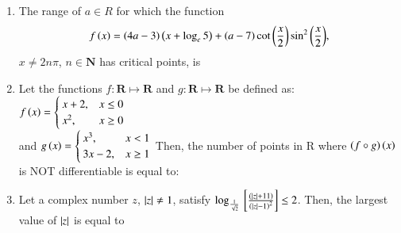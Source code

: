 \documentclass[journal]{IEEEtran}
\numberwithin{equation}{enumi}
\numberwithin{figure}{enumi}
\begin{document}
\begin{enumerate}
    \item 
    The range of $a \in R$ for which the function 
    \begin{align*}
        f\left(x\right) = \left(4a - 3\right)\left(x + \log_e 5\right) + \left(a - 7\right)\cot{\ensuremath{\left(\frac{x}{2}\right)}}\sin^2{\left(\frac{x}{2}\right)},
    \end{align*}
    $x \neq 2n\pi$, $n\in\mathbf{N}$ has critical points, is
    \begin{enumerate}
    \end{enumerate}

    \item 
    Let the functions $f:\mathbf{R}\mapsto\mathbf{R}$ and $g:\mathbf{R}\mapsto\mathbf{R}$ be defined as:
    $f\left(x\right)=
    \begin{cases}
        x + 2, & x\leq0\\
        x^2, & x\geq0
    \end{cases}$ \\ and 
    $g\left(x\right)=
    \begin{cases}
        x^3, & x<1\\
        3x-2, & x\geq1
    \end{cases}$
    Then, the number of points in R where $\left(f\circ g\right)\left(x\right)$ is NOT differentiable is equal to: 
    \begin{enumerate}
    \end{enumerate}

    \item
    Let a complex number $z$, $\left\vert z\right\vert \neq 1$, satisfy $\log_{\frac{1}{\sqrt{2}}} {}\left[\frac{\left(\left\vert z\right\vert + 11\right)}{\left(\left\vert z\right\vert - 1\right)^2}\right] \leq 2$. Then, the largest value of $\left\vert z\right\vert$ is equal to 
    \begin{enumerate}
    \end{enumerate}
    

\end{enumerate}
\end{document}
